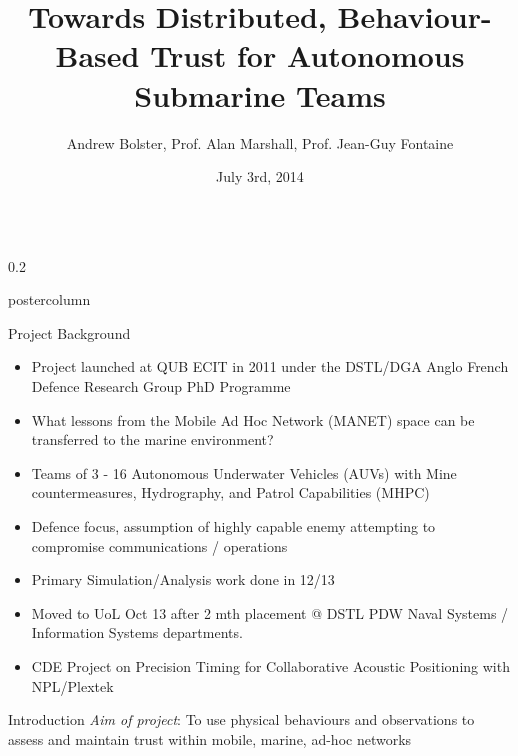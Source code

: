 \documentclass[final,hyperref={pdfpagelabels=false}]{beamer}
\title{\huge Towards Distributed, Behaviour-Based Trust for Autonomous Submarine Teams}
\author{Andrew Bolster, Prof. Alan Marshall, Prof. Jean-Guy Fontaine }
\institute[UoL]{Advanced Networks Research Group, University of Liverpool, UK}
\date[03/07/14]{July 3rd, 2014}
\def\colwidth{0.2\linewidth}
\begin{document}
\begin{frame}[fragile]
  \begin{columns}[T]
    \begin{column}{\colwidth}
      \begin{beamercolorbox}[center,wd=\textwidth]{postercolumn}
        \begin{minipage}[T]{.98\textwidth}  %
          \parbox[t]{\textwidth}{ %
          \begin{block}{Project Background}

            \begin{itemize}
              \item Project launched at QUB ECIT in 2011 under the DSTL/DGA Anglo French Defence Research Group PhD Programme  \item What lessons from the Mobile Ad Hoc Network (MANET) space can be transferred to the marine environment?
              \item Teams of 3 - 16 Autonomous Underwater Vehicles (AUVs) with Mine countermeasures, Hydrography, and Patrol Capabilities (MHPC)
              \item Defence focus, assumption of highly capable enemy attempting to compromise communications / operations
              \item Primary Simulation/Analysis work done in 12/13
              \item Moved to UoL Oct 13 after 2 mth placement @ DSTL PDW Naval Systems / Information Systems departments.
              \item CDE Project on Precision Timing for Collaborative Acoustic Positioning with NPL/Plextek
            \end{itemize}
          \end{block}

          \begin{block}{Introduction}
            \emph{Aim of project}: To use physical behaviours and observations to assess and maintain trust within mobile, marine, ad-hoc networks


\end{block}}
\end{minipage}
\end{beamercolorbox}
\end{column}
\end{columns}
\end{frame}
\end{document}
